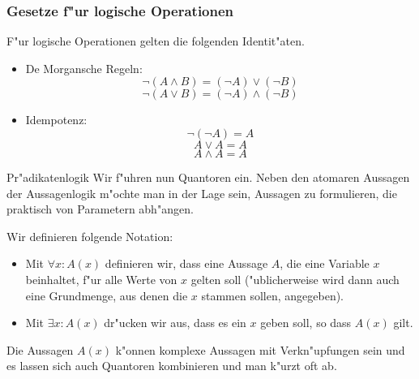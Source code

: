 \documentclass{beamer}
\begin{document}
\begin{frame}
  \frametitle{Gesetze f"ur logische Operationen}
  F"ur logische Operationen gelten die folgenden Identit"aten. 
  \begin{itemize}
    \item De Morgansche Regeln: \[\neg(A\wedge B) = (\neg A)\vee(\neg B)\]\[\neg(A\vee B) = (\neg A)\wedge(\neg B)\]
    \item Idempotenz: \[\neg(\neg A) = A\]\[A\vee A = A\]\[A\wedge A = A\]
  \end{itemize}
   
\end{frame}

\begin{frame}{Pr"adikatenlogik}
  Wir f"uhren nun Quantoren ein. Neben den atomaren Aussagen der Aussagenlogik m"ochte man in der Lage sein, Aussagen zu formulieren, die praktisch von Parametern abh"angen.
  \begin{definition}[Quantoren]
    Wir definieren folgende Notation:
    \begin{itemize}
      \item Mit $\forall x:A(x)$ definieren wir, dass eine Aussage $A$, die eine Variable $x$ beinhaltet, f"ur alle Werte von $x$ gelten soll ("ublicherweise wird dann auch eine Grundmenge, aus denen die $x$ stammen sollen, angegeben).
      \item Mit $\exists x:A(x)$ dr"ucken wir aus, dass es ein $x$ geben soll, so dass $A(x)$ gilt.
    \end{itemize}
  \end{definition}

  Die Aussagen $A(x)$ k"onnen komplexe Aussagen mit Verkn"upfungen sein und es lassen sich auch Quantoren kombinieren und man k"urzt oft ab.
\end{frame}
\end{document}
